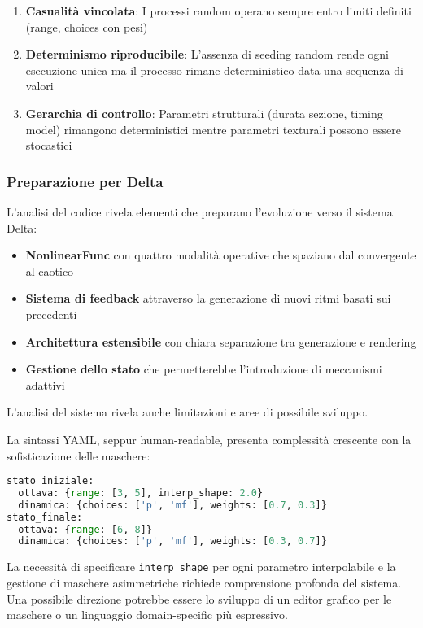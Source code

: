 \begin{enumerate}
    \item \textbf{Casualità vincolata}: I processi random operano sempre entro limiti definiti (range, choices con pesi)
    \item \textbf{Determinismo riproducibile}: L'assenza di seeding random rende ogni esecuzione unica ma il processo rimane deterministico data una sequenza di valori
    \item \textbf{Gerarchia di controllo}: Parametri strutturali (durata sezione, timing model) rimangono deterministici mentre parametri texturali possono essere stocastici
\end{enumerate}
\subsubsection{Preparazione per Delta}
L'analisi del codice rivela elementi che preparano l'evoluzione verso il sistema Delta:

\begin{itemize}
    \item \textbf{NonlinearFunc} con quattro modalità operative che spaziano dal convergente al caotico
    \item \textbf{Sistema di feedback} attraverso la generazione di nuovi ritmi basati sui precedenti
    \item \textbf{Architettura estensibile} con chiara separazione tra generazione e rendering
    \item \textbf{Gestione dello stato} che permetterebbe l'introduzione di meccanismi adattivi
\end{itemize}

L'analisi del sistema rivela anche limitazioni e aree di possibile sviluppo.

La sintassi YAML, seppur human-readable, presenta complessità crescente con la sofisticazione delle maschere:

\begin{lstlisting}[language=Python]
stato_iniziale:
  ottava: {range: [3, 5], interp_shape: 2.0}
  dinamica: {choices: ['p', 'mf'], weights: [0.7, 0.3]}
stato_finale:
  ottava: {range: [6, 8]}
  dinamica: {choices: ['p', 'mf'], weights: [0.3, 0.7]}
\end{lstlisting}

La necessità di specificare \texttt{interp\_shape} per ogni parametro interpolabile e la gestione di maschere asimmetriche richiede comprensione profonda del sistema. Una possibile direzione potrebbe essere lo sviluppo di un editor grafico per le maschere o un linguaggio domain-specific più espressivo.
